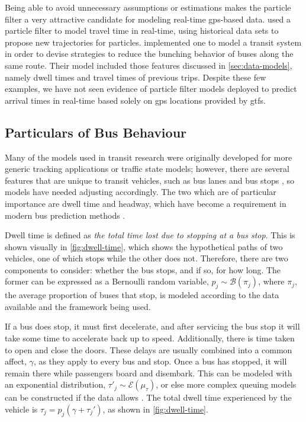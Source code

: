 \documentclass[12pt,a4paper]{article}
\newcommand{\pf}{particle filter}
\begin{document}
Being able to avoid unnecessary assumptions or estimations makes the
\pf{} a very attractive candidate for modeling real-time \gls{gps}-based data.
\cite{chen-rakha:2014} used a \pf{} to model travel time in real-time,
using historical data sets to propose new trajectories for particles.
\cite{hans-etal:2015} implemented one to model a transit system
in order to devise strategies
to reduce the bunching behavior of buses along the same route.
Their model included those features discussed in \cref{sec:data-models},
namely dwell times and travel times of previous trips.
Despite these few examples,
we have not seen evidence of \pf{} models deployed
to predict arrival times in real-time based solely on \gls{gps} locations provided
by \gls{gtfs}.



\subsection{Particulars of Bus Behaviour}
\label{sec:bus-behaviour}

Many of the models used in transit research were originally developed for 
more generic tracking applications or traffic state models;
however, there are several features that are unique to transit vehicles,
such as bus lanes and bus stops \citep{yu-etal:2011},
so models have needed adjusting accordingly.
The two which are of particular importance are dwell time and headway,
which have become a requirement in modern bus prediction methods
\citep{jeong-rilett:2005,hans-etal:2014,hans-etal:2015,cats-loutos:2016}.


Dwell time is defined as \emph{the total time lost due to stopping at a bus stop}.
This is shown visually in \cref{fig:dwell-time},
which shows the hypothetical paths of two vehicles, 
one of which stops while the other does not.
Therefore, there are two components to consider:
whether the bus stops, and if so, for how long.
The former can be expressed as a Bernoulli random variable, $p_j \sim \mathcal{B}(\pi_j)$,
where $\pi_j$, the average proportion of buses that stop,
is modeled according to the data available and the framework being used.


If a bus does stop, it must first decelerate,
and after servicing the bus stop it will take some time to accelerate back up to speed.
Additionally, there is time taken to open and close the doors.
These delays are usually combined into a common affect, $\gamma$,
as they apply to every bus and stop.
Once a bus has stopped, it will remain there while passengers board and disembark.
This can be modeled with an exponential distribution,
$\tau'_j \sim \mathcal{E}(\mu_\tau)$,
or else more complex queuing models can be constructed if the data allows
\citep{hans-etal:2015}.
The total dwell time experienced by the vehicle is $\tau_j = p_j(\gamma + \tau_j')$,
as shown in \cref{fig:dwell-time}.
\end{document}
